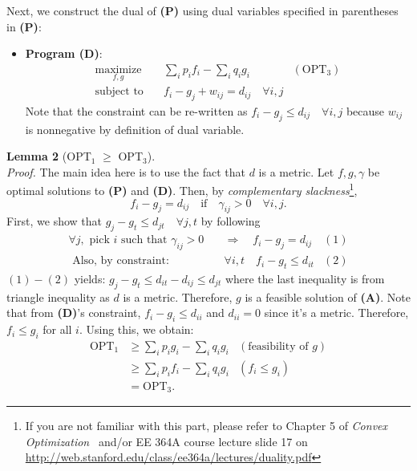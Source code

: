 \documentclass[11pt]{article}
\newcommand{\1}{\mathbb{I}} %
\begin{document}
\noindent Next, we construct the dual of \textbf{(P)} using dual variables specified in parentheses in \textbf{(P)}:
\begin{itemize}
    \item \textbf{Program (D)}:
    \begin{align*}
        \mbox{$\underset{f,g}{\text{maximize}}$} \quad &\sum_i p_if_i - \sum_i q_ig_i &\left(\text{OPT}_3\right)\\
        \mbox{subject to} \quad & f_i - g_j + w_{ij} = d_{ij} \quad \forall i,j
    \end{align*}
    Note that the constraint can be re-written as $f_i - g_j \le d_{ij} \quad  \forall i,j$ because $w_{ij}$ is nonnegative by definition of dual variable.\\
\end{itemize}

\noindent \textbf{Lemma 2} (OPT$_1$ $\ge$ OPT$_3$).\\
\textit{Proof.} The main idea here is to use the fact that $d$ is a metric. Let $f, g, \gamma$ be optimal solutions to \textbf{(P)} and \textbf{(D)}. Then, by \emph{complementary slackness}\footnote{If you are not familiar with this part, please refer to Chapter 5 of \emph{Convex Optimization}~\cite{BoV:04} and/or EE 364A course lecture slide 17 on \url{http://web.stanford.edu/class/ee364a/lectures/duality.pdf}},
$$f_i - g_j = d_{ij} \quad \text{if} \quad \gamma_{ij} > 0 \quad \forall i,j.$$
First, we show that $g_j - g_t \le d_{jt} \quad \forall j,t$ by following
\begin{align*}
    \forall j, \text{ pick } i \text{ such that } \gamma_{ij} > 0 \quad &\Longrightarrow \quad f_i - g_j = d_{ij} & (1)\\
    \text{ Also, by constraint: } &\forall i,t \quad f_i - g_t \le d_{it} & (2)
\end{align*}
$(1) - (2)$ yields: $g_j - g_t \le d_{it} - d_{ij} \le d_{jt}$ where the last inequality is from triangle inequality as $d$ is a metric. Therefore, $g$ is a feasible solution of \textbf{(A)}. Note that from \textbf{(D)}'s constraint, $f_i - g_i \le d_{ii}$ and $d_{ii} = 0$ since it's a metric. Therefore, $f_i \le g_i$ for all $i$. Using this, we obtain:
\begin{align*}
    \text{OPT}_1 &\ge \sum_i p_ig_i - \sum_i q_ig_i &\left( \text{feasibility of } g\right)\\
    &\ge \sum_i p_if_i - \sum_i q_ig_i &\left( f_i \le g_i\right)\\
    &= \text{OPT}_3.
\end{align*}
\end{document}
